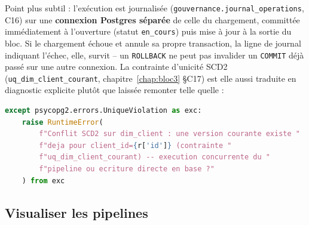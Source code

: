 Point plus subtil : l'exécution est journalisée
(\texttt{gouvernance.journal\_operations}, C16) sur une \textbf{connexion
Postgres séparée} de celle du chargement, committée immédiatement à
l'ouverture (statut \texttt{en\_cours}) puis mise à jour à la sortie du
bloc. Si le chargement échoue et annule sa propre transaction, la ligne
de journal indiquant l'échec, elle, survit -- un \texttt{ROLLBACK} ne
peut pas invalider un \texttt{COMMIT} déjà passé sur une autre
connexion. La contrainte d'unicité SCD2
(\texttt{uq\_dim\_client\_courant}, chapitre~\ref{chap:bloc3} §C17) est
elle aussi traduite en diagnostic explicite plutôt que laissée remonter
telle quelle :

\begin{lstlisting}[language=Python,caption={Traduction d'une violation de contrainte en diagnostic (\filepath{src/datacore/storage/warehouse/load_warehouse.py})}]
except psycopg2.errors.UniqueViolation as exc:
    raise RuntimeError(
        f"Conflit SCD2 sur dim_client : une version courante existe "
        f"deja pour client_id={r['id']} (contrainte "
        f"uq_dim_client_courant) -- execution concurrente du "
        f"pipeline ou ecriture directe en base ?"
    ) from exc
\end{lstlisting}

\subsection{Visualiser les pipelines}

